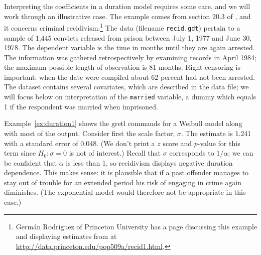 Interpreting the coefficients in a duration model requires some care,
and we will work through an illustrative case. The example comes from
section 20.3 of \cite{wooldridge-panel}, and it concerns criminal
recidivism.\footnote{Germ\'an Rodr\'iguez of Princeton University has a
  page discussing this example and displaying estimates from
   at \url{http://data.princeton.edu/pop509a/recid1.html}.}
The data (filename \texttt{recid.gdt}) pertain to a sample of 1,445
convicts released from prison between July 1, 1977 and June 30,
1978. The dependent variable is the time in months until they are
again arrested. The information was gathered retrospectively by
examining records in April 1984; the maximum possible length of
observation is 81 months.  Right-censoring is important: when the date
were compiled about 62 percent had not been arrested.  The dataset
contains several covariates, which are described in the data file; we
will focus below on interpretation of the \texttt{married} variable, a
dummy which equals 1 if the respondent was married when imprisoned.

Example~\ref{ex:duration1} shows the gretl commands for a
Weibull model along with most of the output.  Consider first the scale
factor, $\sigma$. The estimate is 1.241 with a standard error of
0.048.  (We don't print a $z$ score and $p$-value for this term since
$H_0: \sigma = 0$ is not of interest.)  Recall that $\sigma$
corresponds to $1/\alpha$; we can be confident that $\alpha$ is less
than 1, so recidivism displays negative duration dependence.  This
makes sense: it is plausible that if a past offender manages to stay
out of trouble for an extended period his risk of engaging in crime
again diminishes. (The exponential model would therefore not be
appropriate in this case.)

